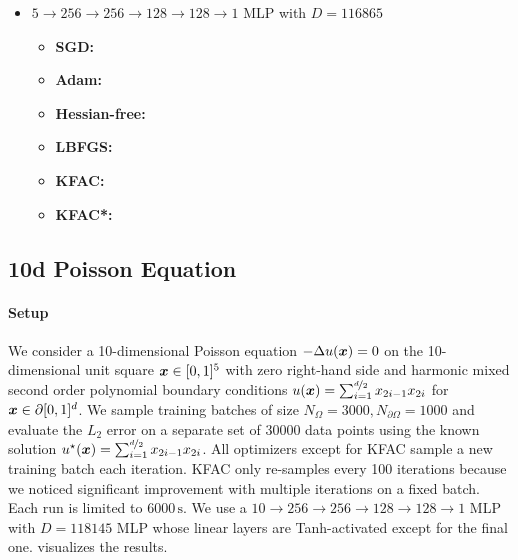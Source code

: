 \begin{itemize}
\item $5 \to 256 \to 256\to 128 \to 128 \to 1$ MLP with $D=\num{116865}$
  \begin{itemize}
    \def\pathToRuns{../kfac_pinns_exp/exp19_poisson5d_mlp_tanh_256/tex}
  \item \textbf{SGD:} 
  \item \textbf{Adam:} 
  \item \textbf{Hessian-free:} 
  \item \textbf{LBFGS:} 
  \item \textbf{KFAC:} 
  \item \textbf{KFAC*:} 
  \end{itemize}
\end{itemize}

\subsection{10d Poisson Equation}\label{sec:poisson10d-appendix}

\paragraph{Setup} We consider a 10-dimensional Poisson equation $-\Delta u({\bm{x}}) = 0$ on the 10-dimensional unit square ${\bm{x}} \in [0, 1]^5$ with zero right-hand side and harmonic mixed second order polynomial boundary conditions $u({\bm{x}}) = \sum_{i=1}^{\nicefrac{d}{2}} {x}_{2i-1} {x}_{2i}$ for ${\bm{x}} \in \partial [0,1]^d$.
We sample training batches of size $N_{\Omega} = \num{3000}, N_{\partial\Omega} = 1000$ and evaluate the $L_2$ error on a separate set of $\num{30000}$ data points using the known solution $u^{\star}({\bm{x}}) = \sum_{i=1}^{\nicefrac{d}{2}} {x}_{2i-1} {x}_{2i}$.
All optimizers except for KFAC sample a new training batch each iteration.
KFAC only re-samples every 100 iterations because we noticed significant improvement with multiple iterations on a fixed batch.
Each run is limited to $\num{6000}\,\text{s}$.
We use a $10 \to 256 \to 256\to 128 \to 128 \to 1$ MLP with $D=\num{118145}$ MLP whose linear layers are Tanh-activated except for the final one.
 visualizes the results.

